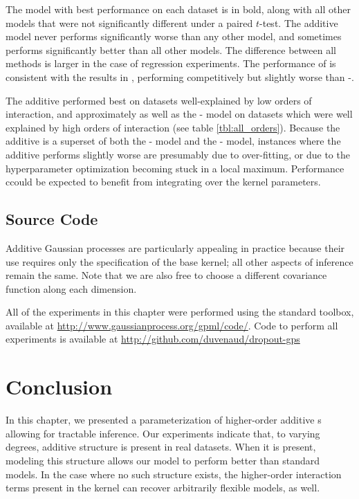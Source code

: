 The model with best performance on each dataset is in bold, along with all other models that were not significantly different under a paired $t$-test.
The additive model never performs significantly worse than any other model, and sometimes performs significantly better than all other models.
The difference between all methods is larger in the case of regression experiments.
The performance of \HKL{} is consistent with the results in \citep{DBLP:journals/corr/abs-0909-0844}, performing competitively but slightly worse than \SE{}-\gp{}.%

The additive \gp{} performed best on datasets well-explained by low orders of interaction, and approximately as well as the \SE{}-\gp{} model on datasets which were well explained by high orders of interaction (see table \ref{tbl:all_orders}).
Because the additive \gp{} is a superset of both the \gp{}-\GAM{} model and the \kSE{}-\gp{} model, instances where the additive \gp{} performs slightly worse are presumably due to over-fitting, or due to the hyperparameter optimization becoming stuck in a local maximum. %
Performance ccould be expected to benefit from integrating over the kernel parameters.


\subsection{Source Code}
Additive Gaussian processes are particularly appealing in practice because their use requires only the specification of the base kernel; all other aspects of \gp{} inference remain the same.
Note that we are also free to choose a different covariance function along each dimension.

All of the experiments in this chapter were performed using the standard \GPML{} toolbox, available at \url{http://www.gaussianprocess.org/gpml/code/}.
Code to perform all experiments is available at \url{http://github.com/duvenaud/dropout-gps}





\section{Conclusion}

In this chapter, we presented a parameterization of higher-order additive \gp{}s allowing for tractable inference.
Our experiments indicate that, to varying degrees, additive structure is present in real datasets.
When it is present, modeling this structure allows our model to perform better than standard \gp{} models.
In the case where no such structure exists, the higher-order interaction terms present in the kernel can recover arbitrarily flexible models, as well.

